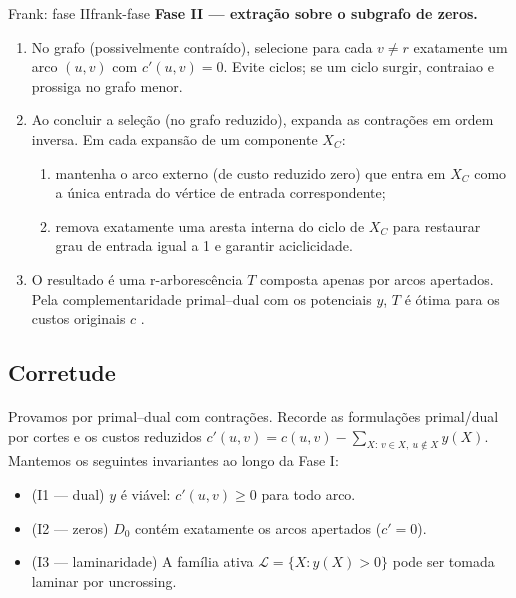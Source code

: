 \documentclass[12pt,a4paper]{article}
\def\emph#1{#1}%
\begin{document}
\begin{algobox}{Frank: fase II}{frank-fase}
    \textbf{Fase II — extração sobre o subgrafo de zeros.}
    \begin{enumerate}\setlength{\itemsep}{1pt}
        \item No grafo (possivelmente contraído), selecione para cada \(v\neq r\) exatamente um arco \((u,v)\) com \(c'(u,v)=0\). Evite ciclos; se um ciclo surgir, contraia\-o e prossiga no grafo menor.
        \item Ao concluir a seleção (no grafo reduzido), expanda as contrações em ordem inversa. Em cada expansão de um componente \(X_C\):
              \begin{enumerate}\setlength{\itemsep}{1pt}
                  \item mantenha o arco externo (de custo reduzido zero) que \emph{entra} em \(X_C\) como a única entrada do vértice de entrada correspondente;
                  \item remova exatamente uma aresta interna do ciclo de \(X_C\) para restaurar grau de entrada igual a 1 e garantir aciclicidade.
              \end{enumerate}
        \item O resultado é uma r-arborescência \(T\) composta apenas por arcos \emph{apertados}. Pela complementaridade primal–dual com os potenciais \(y\), \(T\) é ótima para os custos originais \(c\) \cite{frank2014,schrijver2003comb}.
    \end{enumerate}
\end{algobox}

\subsection{Corretude}
\paragraph{}
Provamos por primal–dual com contrações. Recorde as formulações primal/dual por cortes e os \emph{custos reduzidos} \(c'(u,v)=c(u,v)-\sum_{X:\,v\in X,\ u\notin X} y(X)\). Mantemos os seguintes invariantes ao longo da Fase I:
\begin{itemize}\setlength{\itemsep}{2pt}
    \item (I1 — dual) \(y\) é viável: \(c'(u,v)\ge 0\) para todo arco.
    \item (I2 — zeros) \(D_0\) contém exatamente os arcos \emph{apertados} (\(c'=0\)).
    \item (I3 — laminaridade) A família ativa \(\mathcal{L}=\{X: y(X)>0\}\) pode ser tomada laminar por \emph{uncrossing}.
\end{itemize}
\end{document}
